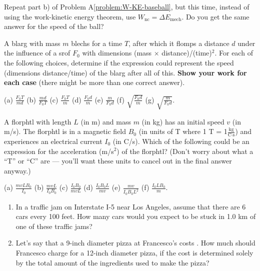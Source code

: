 \begin{exercise}
Repeat part b) of Problem A\ref{problem:W-KE-baseball}, but this time,
instead of using the work-kinetic energy theorem, use 
$W_\text{nc} = \Delta E_\text{mech}$.  Do you get the same answer for 
the speed of the ball?
\label{problem:W-KE-baseball_II}
\end{exercise}

 \begin{exercise}
 A blarg with mass $m$ blechs for a time $T$, after which it flomps
a distance $d$ under the influence of a srof $F_0$ with dimensions
(mass $\times$ distance)/(time)$^2$.  For each of the following
choices, determine if the expression could represent the speed
(dimensions distance/time) of the blarg after all of this.  \textbf{Show
your work for each case} (there might be more than one correct
answer).

 (a) $\frac{F_0T}{md}$ \quad 
 (b) $\frac{md}{F_0T}$ \quad 
 (c) $\frac{F_0T}{m}$ \quad
 (d) $\frac{F_0d}{m}$ \quad
 (e) $\frac{m}{F_0d}$ \quad
 (f) $\sqrt{\frac{F_0d}{m}}$ \quad
(g) $\sqrt{\frac{m}{F_0d}}$.
\label{problem:blarg_dimensions} 
\end{exercise}

\begin{exercise}
A florphtl with length $L$ (in m) and mass $m$ (in kg) has an initial
speed $v$ (in m/s). The florphtl is in a magnetic field $B_0$ (in
units of T where 1 T = 1$\frac{\text{kg}}{\text{C}\cdot\text{s}}$) and
experiences an electrical current $I_0$ (in C/s).  Which of the
following could be an expression for the acceleration (m/s$^2$) of the
florphtl?  (Don't worry about what a ``T'' or ``C'' are --- you'll want
these units to cancel out in the final answer anyway.)

(a) $\frac{mvLB_0}{I_0}$ \quad 
(b) $\frac{mvL}{I_0B_0}$ \quad
(c) $\frac{I_0B_0}{mvL}$ \quad
 (d) $\frac{I_0B_0L}{mv}$ \quad
(e) $\frac{mv}{I_0B_0L^2}$ \quad 
(f) $\frac{I_0LB_0}{m}$.
\label{problem:florphtl_dimensions}
\end{exercise}



\begin{exercise}
\begin{enumerate}
\item In a traffic jam on Interstate I-5 near Los Angeles, assume that 
there are 6 cars every 100 feet. How many cars would you expect to
be stuck in 1.0 km of one of these traffic jams?  
\item Let's say that a 9-inch diameter pizza at Francesco's costs
. How much should Francesco charge for a 12-inch diameter
pizza, if the cost is determined solely by the total amount of the
ingredients used to make the pizza?
\end{enumerate}
\label{problem:ratios_trafficandpizza}
\end{exercise}

